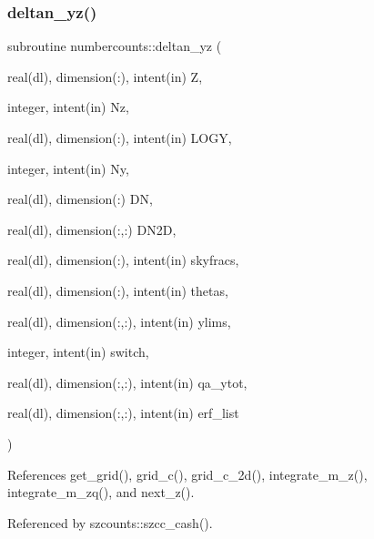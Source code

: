 \subsubsection{\texorpdfstring{deltan\+\_\+yz()}{deltan\_yz()}}
{\footnotesize\ttfamily subroutine numbercounts\+::deltan\+\_\+yz (\begin{DoxyParamCaption}\item[{real(dl), dimension(\+:), intent(in)}]{Z,  }\item[{integer, intent(in)}]{Nz,  }\item[{real(dl), dimension(\+:), intent(in)}]{L\+O\+GY,  }\item[{integer, intent(in)}]{Ny,  }\item[{real(dl), dimension(\+:)}]{DN,  }\item[{real(dl), dimension(\+:,\+:)}]{D\+N2D,  }\item[{real(dl), dimension(\+:), intent(in)}]{skyfracs,  }\item[{real(dl), dimension(\+:), intent(in)}]{thetas,  }\item[{real(dl), dimension(\+:,\+:), intent(in)}]{ylims,  }\item[{integer, intent(in)}]{switch,  }\item[{real(dl), dimension(\+:,\+:), intent(in)}]{qa\+\_\+ytot,  }\item[{real(dl), dimension(\+:,\+:), intent(in)}]{erf\+\_\+list }\end{DoxyParamCaption})}



References get\+\_\+grid(), grid\+\_\+c(), grid\+\_\+c\+\_\+2d(), integrate\+\_\+m\+\_\+z(), integrate\+\_\+m\+\_\+zq(), and next\+\_\+z().



Referenced by szcounts\+::szcc\+\_\+cash().

